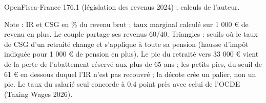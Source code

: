 OpenFisca-France 176.1 (législation des revenus 2024) ; calculs de l'auteur.\par Note : IR et CSG en \% du revenu brut ; taux marginal calculé sur 1 000 \euro{} de revenu en plus. Le couple partage ses revenus 60/40. Triangles : seuils où le taux de CSG d'un retraité change et s'applique à toute sa pension (hausse d'impôt indiquée pour 1 000 \euro{} de pension en plus). Le pic du retraité vers 33 000 \euro{} vient de la perte de l'abattement réservé aux plus de 65 ans ; les petits pics, du seuil de 61 \euro{} en dessous duquel l'IR n'est pas recouvré ; la décote crée un palier, non un pic. Le taux du salarié seul concorde à 0,4 point près avec celui de l'OCDE (Taxing Wages 2026).
